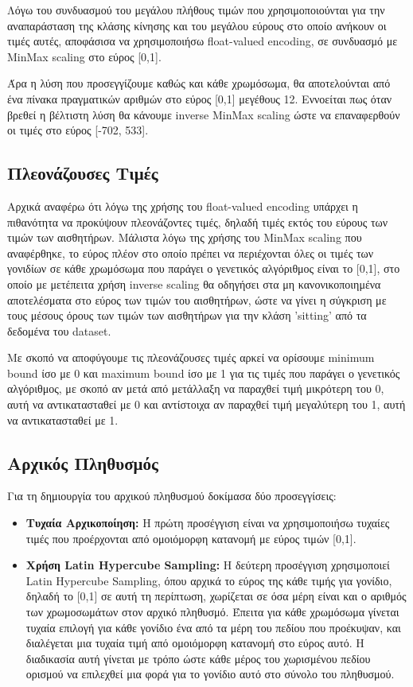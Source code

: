 \documentclass[12pt,a4paper]{article}
\begin{document}
Λόγω του συνδυασμού του μεγάλου πλήθους τιμών που χρησιμοποιούνται για την αναπαράσταση της κλάσης κίνησης και του μεγάλου εύρους στο οποίο ανήκουν οι τιμές αυτές, αποφάσισα να χρησιμοποιήσω float-valued encoding, σε συνδυασμό με MinMax scaling στο εύρος [0,1].

Άρα η λύση που προσεγγίζουμε καθώς και κάθε χρωμόσωμα, θα αποτελούνται από ένα πίνακα πραγματικών αριθμών στο εύρος [0,1] μεγέθους 12. Εννοείται πως όταν βρεθεί η βέλτιστη λύση θα κάνουμε inverse MinMax scaling ώστε να επαναφερθούν οι τιμές στο εύρος [-702, 533]. 

\subsection{Πλεονάζουσες Τιμές}

Αρχικά αναφέρω ότι λόγω της χρήσης του float-valued encoding υπάρχει η πιθανότητα να προκύψουν πλεονάζοντες τιμές, δηλαδή τιμές εκτός του εύρους των τιμών των αισθητήρων. Μάλιστα λόγω της χρήσης του MinMax scaling που αναφέρθηκε, το εύρος πλέον στο οποίο πρέπει να περιέχονται όλες οι τιμές των γονιδίων σε κάθε χρωμόσωμα που παράγει ο γενετικός αλγόριθμος είναι το [0,1], στο οποίο με μετέπειτα χρήση inverse scaling θα οδηγήσει στα μη κανονικοποιημένα αποτελέσματα στο εύρος των τιμών του αισθητήρων, ώστε να γίνει η σύγκριση με τους μέσους όρους των τιμών των αισθητήρων για την κλάση 'sitting' από τα δεδομένα του dataset.

Με σκοπό να αποφύγουμε τις πλεονάζουσες τιμές αρκεί να ορίσουμε minimum bound ίσο με 0 και maximum bound ίσο με 1 για τις τιμές που παράγει ο γενετικός αλγόριθμος, με σκοπό αν μετά από μετάλλαξη να παραχθεί τιμή μικρότερη του 0, αυτή να αντικατασταθεί με 0 και αντίστοιχα αν παραχθεί τιμή μεγαλύτερη του 1, αυτή να αντικατασταθεί με 1. 

\subsection{Αρχικός Πληθυσμός}

Για τη δημιουργία του αρχικού πληθυσμού δοκίμασα δύο προσεγγίσεις: 

\begin{itemize}
    \item \textbf{Τυχαία Αρχικοποίηση:} Η πρώτη προσέγγιση είναι να χρησιμοποιήσω τυχαίες τιμές που προέρχονται από ομοιόμορφη κατανομή με εύρος τιμών [0,1]. 

    \item \textbf{Χρήση Latin Hypercube Sampling:} Η δεύτερη προσέγγιση χρησιμοποιεί Latin Hypercube Sampling, όπου αρχικά το εύρος της κάθε τιμής για γονίδιο, δηλαδή το [0,1] σε αυτή τη περίπτωση, χωρίζεται σε όσα μέρη είναι και ο αριθμός των χρωμοσωμάτων στον αρχικό πληθυσμό. Έπειτα για κάθε χρωμόσωμα γίνεται τυχαία επιλογή για κάθε γονίδιο ένα από τα μέρη του πεδίου που προέκυψαν, και διαλέγεται μια τυχαία τιμή από ομοιόμορφη κατανομή στο εύρος αυτό. Η διαδικασία αυτή γίνεται με τρόπο ώστε κάθε μέρος του χωρισμένου πεδίου ορισμού να επιλεχθεί μια φορά για το γονίδιο αυτό στο σύνολο του πληθυσμού.
\end{itemize}
\end{document}

